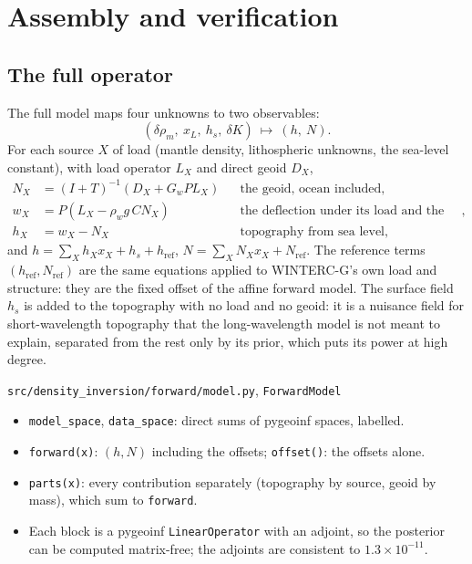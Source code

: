 \chapter{Assembly and verification}
\label{ch:assembly}

\section{The full operator}

The full model maps four unknowns to two observables:
\[
    (\delta\rho_m,\ x_L,\ h_s,\ \delta K)\ \longmapsto\ (h,\ N) .
\]
For each source $X$ of load (mantle density, lithospheric unknowns, the sea-level constant), with load operator $L_X$ and direct geoid $D_X$,
\begin{align}
    N_X &= (I+T)^{-1}\left(D_X + G_w P L_X\right) && \text{the geoid, ocean included},\\
    w_X &= P\left(L_X - \rho_w g\,C N_X\right) && \text{the deflection under its load and the water's},\\
    h_X &= w_X - N_X && \text{topography from sea level},
\end{align}
and $h = \sum_X h_X x_X + h_s + h_{\mathrm{ref}}$, $N = \sum_X N_X x_X + N_{\mathrm{ref}}$.
The reference terms $(h_{\mathrm{ref}}, N_{\mathrm{ref}})$ are the same equations applied to WINTERC-G's own load and structure: they are the fixed offset of the affine forward model.
The surface field $h_s$ is added to the topography with no load and no geoid: it is a nuisance field for short-wavelength topography that the long-wavelength model is not meant to explain, separated from the rest only by its prior, which puts its power at high degree.

\begin{incode}{\texttt{src/density\_inversion/forward/model.py}, \texttt{ForwardModel}}
\begin{itemize}[nosep]
\item \texttt{model\_space}, \texttt{data\_space}: direct sums of pygeoinf spaces, labelled.
\item \texttt{forward(x)}: $(h, N)$ including the offsets; \texttt{offset()}: the offsets alone.
\item \texttt{parts(x)}: every contribution separately (topography by source, geoid by mass), which sum to \texttt{forward}.
\item Each block is a pygeoinf \texttt{LinearOperator} with an adjoint, so the posterior can be computed matrix-free; the adjoints are consistent to $1.3\times10^{-11}$.
\end{itemize}
\end{incode}

